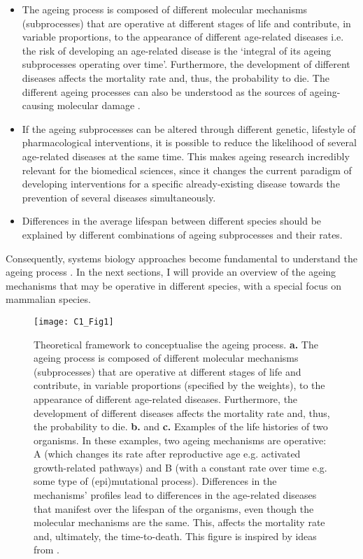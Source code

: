 \begin{itemize}
	
	\item The ageing process is composed of different molecular mechanisms (subprocesses) that are operative at different stages of life and contribute, in variable proportions, to the appearance of different age-related diseases i.e. the risk of developing an age-related disease is the `integral of its ageing subprocesses operating over time'. Furthermore, the development of different diseases affects the mortality rate and, thus, the probability to die. The different ageing processes can also be understood as the sources of ageing-causing molecular damage \cite{Lopez-Otin2013}.
	
	\item If the ageing subprocesses can be altered through different genetic, lifestyle of pharmacological interventions, it is possible to reduce the likelihood of several age-related diseases at the same time. This makes ageing research incredibly relevant for the biomedical sciences, since it changes the current paradigm of developing interventions for a specific already-existing disease towards the prevention of several diseases simultaneously.
	
	\item  Differences in the average lifespan between different species should be explained by different combinations of ageing subprocesses and their rates.
		
\end{itemize}	

Consequently, systems biology approaches become fundamental to understand the ageing process \cite{Freund2019}. In the next sections, I will provide an overview of the ageing mechanisms that may be operative in different species, with a special focus on mammalian species. 

\begin{figure}[htbp!] 
	\centering    
	\texttt{[image: C1\_Fig1]}
	\vspace*{1 mm}
	\caption[Theoretical framework to conceptualise the ageing process]{Theoretical framework to conceptualise the ageing process. \textbf{a.} The ageing process is composed of different molecular mechanisms (subprocesses) that are operative at different stages of life and contribute, in variable proportions (specified by the weights), to the appearance of different age-related diseases. Furthermore, the development of different diseases affects the mortality rate and, thus, the probability to die. \textbf{b.} and \textbf{c.} Examples of the life histories of two organisms. In these examples, two ageing mechanisms are operative: A (which changes its rate after reproductive age e.g. activated growth-related pathways) and B (with a constant rate over time e.g. some type of (epi)mutational process). Differences in the mechanisms' profiles lead to differences in the age-related diseases that manifest over the lifespan of the organisms, even though the molecular mechanisms are the same. This, affects the mortality rate and, ultimately, the time-to-death. This figure is inspired by ideas from \cite{Hayflick2007,Gems2015,Peto1997,Freund2019}.}
	\label{fig:c1_fig1}
\end{figure}

